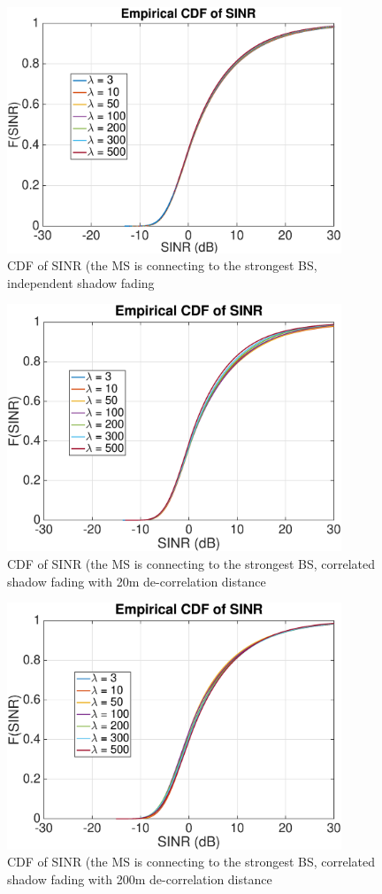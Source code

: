  \begin{figure}
 \centering
 \includegraphics[width=10cm]{MaxMax1000OutageProbCDFiid.eps}
 \caption{CDF of SINR (the MS is connecting to the strongest BS, independent shadow fading}
 \label{4:Mode12}
 \end{figure}
 \begin{figure}
 \centering
 \includegraphics[width=10cm]{MaxMax1000OutageProbCDFDeCorr20.eps}
 \caption{CDF of SINR (the MS is connecting to the strongest BS, correlated shadow fading with 20m de-correlation distance}
 \label{4:Mode22}
 \end{figure}
 \begin{figure}
 \centering
 \includegraphics[width=10cm]{MaxMax1000OutageProbCDFDeCorr200.eps}
 \caption{CDF of SINR (the MS is connecting to the strongest BS, correlated shadow fading with 200m de-correlation distance}
 \label{4:Mode32}
 \end{figure}

